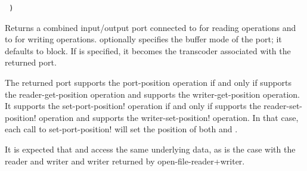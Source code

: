 \begin{entry}{%
{\tt\hspace*{4em}   )}}

Returns a combined input/output port connected to  for
reading operations and to  for writing operations. 
 optionally specifies the buffer mode of the port; it
defaults to {\cf block}.
If  is specified, it becomes the transcoder associated
with the returned port.

The returned port supports the {\cf port-position} operation if and
only if  supports the {\cf reader-get-position} operation and
 supports the {\cf writer-get-position} operation.
It supports the {\cf set-port-position!} operation if and
only if  supports the {\cf reader-set-position!} operation and
 supports the {\cf writer-set-position!} operation.
In that case, each call to {\cf set-port-position!} will set the
position of both  and .

\begin{note}
  It is expected that  and  access the same
  underlying data, as is the case with the reader and writer and
  writer returned by {\cf open-file-reader+writer}.
\end{note}
\end{entry}

